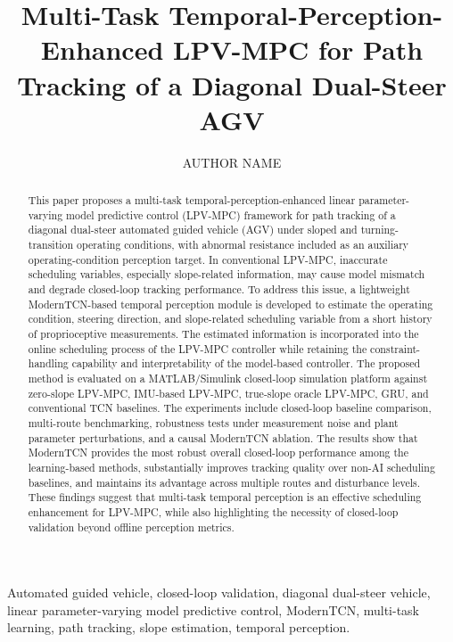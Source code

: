 \documentclass{ieeeaccess}
\begin{document}

\title{Multi-Task Temporal-Perception-Enhanced LPV-MPC for Path Tracking of a Diagonal Dual-Steer AGV}
\author{\uppercase{Author Name}}
\address[1]{Affiliation placeholder.}

\begin{abstract}

This paper proposes a multi-task temporal-perception-enhanced linear parameter-varying model predictive control (LPV-MPC) framework for path tracking of a diagonal dual-steer automated guided vehicle (AGV) under sloped and turning-transition operating conditions, with abnormal resistance included as an auxiliary operating-condition perception target. In conventional LPV-MPC, inaccurate scheduling variables, especially slope-related information, may cause model mismatch and degrade closed-loop tracking performance. To address this issue, a lightweight ModernTCN-based temporal perception module is developed to estimate the operating condition, steering direction, and slope-related scheduling variable from a short history of proprioceptive measurements. The estimated information is incorporated into the online scheduling process of the LPV-MPC controller while retaining the constraint-handling capability and interpretability of the model-based controller. The proposed method is evaluated on a MATLAB/Simulink closed-loop simulation platform against zero-slope LPV-MPC, IMU-based LPV-MPC, true-slope oracle LPV-MPC, GRU, and conventional TCN baselines. The experiments include closed-loop baseline comparison, multi-route benchmarking, robustness tests under measurement noise and plant parameter perturbations, and a causal ModernTCN ablation. The results show that ModernTCN provides the most robust overall closed-loop performance among the learning-based methods, substantially improves tracking quality over non-AI scheduling baselines, and maintains its advantage across multiple routes and disturbance levels. These findings suggest that multi-task temporal perception is an effective scheduling enhancement for LPV-MPC, while also highlighting the necessity of closed-loop validation beyond offline perception metrics.

\end{abstract}

\begin{keywords}

Automated guided vehicle, closed-loop validation, diagonal dual-steer vehicle, linear parameter-varying model predictive control, ModernTCN, multi-task learning, path tracking, slope estimation, temporal perception.

\end{keywords}
\end{document}
